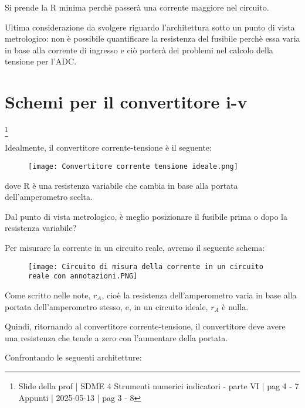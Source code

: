 Si prende la R minima perchè passerà una corrente maggiore nel circuito. \newline 

Ultima considerazione da svolgere riguardo l'architettura sotto un punto di vista metrologico: 
non è possibile quantificare la resistenza del fusibile perchè essa varia in base alla corrente di ingresso e ciò porterà dei problemi nel calcolo della tensione per l'ADC. \newline 

\newpage 

\section{Schemi per il convertitore i-v}
\footnote{Slide della prof | SDME 4 Strumenti numerici indicatori - parte VI | pag 4 - 7 \\  
Appunti | 2025-05-13 | pag 3 - 8}

Idealmente, il convertitore corrente-tensione è il seguente: 

\begin{figure}[h]
    \centering
    \texttt{[image: Convertitore corrente tensione ideale.png]}
\end{figure}

dove R è una resistenza variabile che cambia in base alla portata dell'amperometro scelta. \newline 

Dal punto di vista metrologico, è meglio posizionare il fusibile prima o dopo la resistenza variabile? \newline 

Per misurare la corrente in un circuito reale, avremo il seguente schema: 

\begin{figure}[h]
    \centering
    \texttt{[image: Circuito di misura della corrente in un circuito reale con annotazioni.PNG]}
\end{figure}

Come scritto nelle note, $r_A$, cioè la resistenza dell'amperometro varia in base alla portata dell'amperometro stesso, 
e, in un circuito ideale, $r_A$ è nulla. \newline 

Quindi, ritornando al convertitore corrente-tensione, il convertitore deve avere una resistenza che tende a zero con l'aumentare della portata. \newline 

Confrontando le seguenti architetture: 

